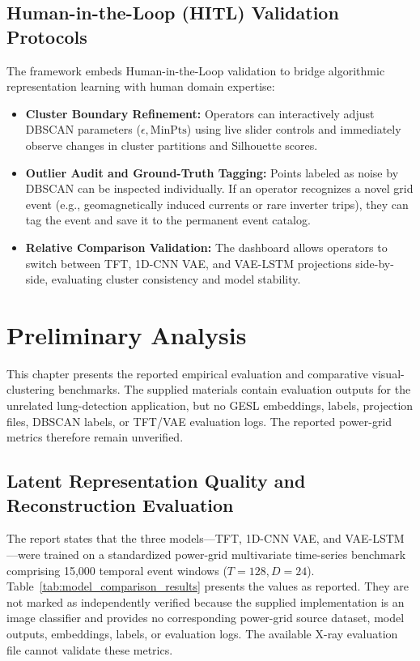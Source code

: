 \documentclass[12pt,a4paper]{report}
\begin{document}
\section{Human-in-the-Loop (HITL) Validation Protocols}
The framework embeds Human-in-the-Loop validation to bridge algorithmic representation learning with human domain expertise:
\begin{itemize}
    \item \textbf{Cluster Boundary Refinement:} Operators can interactively adjust DBSCAN parameters ($\epsilon, \text{MinPts}$) using live slider controls and immediately observe changes in cluster partitions and Silhouette scores.
    \item \textbf{Outlier Audit and Ground-Truth Tagging:} Points labeled as noise by DBSCAN can be inspected individually. If an operator recognizes a novel grid event (e.g., geomagnetically induced currents or rare inverter trips), they can tag the event and save it to the permanent event catalog.
    \item \textbf{Relative Comparison Validation:} The dashboard allows operators to switch between TFT, 1D-CNN VAE, and VAE-LSTM projections side-by-side, evaluating cluster consistency and model stability.
\end{itemize}


\chapter{Preliminary Analysis}

This chapter presents the reported empirical evaluation and comparative visual-clustering benchmarks. The supplied materials contain evaluation outputs for the unrelated lung-detection application, but no GESL embeddings, labels, projection files, DBSCAN labels, or TFT/VAE evaluation logs. The reported power-grid metrics therefore remain unverified.

\section{Latent Representation Quality and Reconstruction Evaluation}
The report states that the three models—TFT, 1D-CNN VAE, and VAE-LSTM—were trained on a standardized power-grid multivariate time-series benchmark comprising 15,000 temporal event windows ($T=128, D=24$). Table~\ref{tab:model_comparison_results} presents the values as reported. They are not marked as independently verified because the supplied implementation is an image classifier and provides no corresponding power-grid source dataset, model outputs, embeddings, labels, or evaluation logs. The available X-ray evaluation file cannot validate these metrics.
\end{document}
